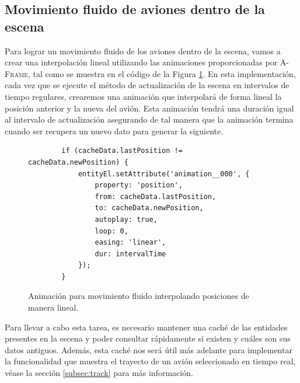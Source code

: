 \documentclass[a4paper, 11pt]{book}
\begin{document}
\subsection{Movimiento fluido de aviones dentro de la escena}
\label{subsec:movimientoFluido}
Para lograr un movimiento fluido de los aviones dentro de la escena, vamos a crear una interpolación lineal utilizando las animaciones proporcionadas por \textsc{A-Frame}, tal como se muestra en el código de la Figura \ref{codigo:movimientoFluido}. En esta implementación, cada vez que se ejecute el método de actualización de la escena en intervalos de tiempo regulares, crearemos una animación que interpolará de forma lineal la posición anterior y la nueva del avión. Esta animación tendrá una duración igual al intervalo de actualización asegurando de tal manera que la animación termina cuando ser recupera un nuevo dato para generar la siguiente.
\begin{figure}[h]
	\centering
	\begin{verbatim}
		if (cacheData.lastPosition != cacheData.newPosition) {
			entityEl.setAttribute('animation__000', {
				property: 'position',
				from: cacheData.lastPosition,
				to: cacheData.newPosition,
				autoplay: true,
				loop: 0,
				easing: 'linear',
				dur: intervalTime
			});
		}
	\end{verbatim}
	\caption{Animación para movimiento fluido interpolando posiciones de manera lineal.
		\label{codigo:movimientoFluido}}
\end{figure}

Para llevar a cabo esta tarea, es necesario mantener una caché de las entidades presentes en la escena y poder consultar rápidamente si existen y cuáles son sus datos antiguos. Además, esta caché nos será útil más adelante para implementar la funcionalidad que muestra el trayecto de un avión seleccionado en tiempo real, véase la sección \ref{subsec:track} para más información.
\end{document}
